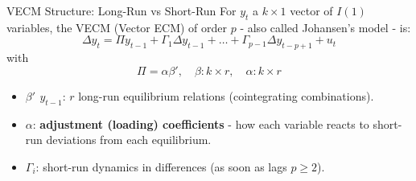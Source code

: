\documentclass{beamer}
\begin{document}
\begin{frame}{VECM Structure: Long-Run vs Short-Run}
\small
For $y_t$ a $k \times 1$ vector of $I(1)$ variables, the VECM (Vector ECM) of order $p$ - also called Johansen's model - is:
\[
\Delta y_t = \Pi y_{t-1}
 + \Gamma_1 \Delta y_{t-1}
 + \dots 
 + \Gamma_{p-1} \Delta y_{t-p+1}
 + u_t
\]
with
\[
\Pi = \alpha \beta',\quad
\beta: k\times r,\quad
\alpha: k\times r
\]

\begin{itemize}
  \item \textbf{$\beta'$ $y_{t-1}$}: $r$ long-run equilibrium relations (cointegrating combinations).
  \item \textbf{$\alpha$}: \textbf{adjustment (loading) coefficients} - how each variable reacts to short-run deviations from each equilibrium.
  \item \textbf{$\Gamma_i$}: short-run dynamics in differences (as soon as lags $p\geq2$).
\end{itemize}

\end{frame}
\end{document}
